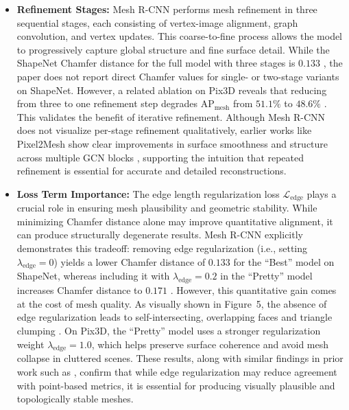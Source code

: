 \begin{itemize}
    \item \textbf{Refinement Stages:} Mesh R-CNN performs mesh refinement in three sequential stages, each consisting of vertex-image alignment, graph convolution, and vertex updates. This coarse-to-fine process allows the model to progressively capture global structure and fine surface detail. While the ShapeNet Chamfer distance for the full model with three stages is \( \mathbf{0.133} \) \cite[Table~2]{gkioxari2020_meshrcnn}, the paper does not report direct Chamfer values for single- or two-stage variants on ShapeNet. However, a related ablation on Pix3D reveals that reducing from three to one refinement step degrades AP$_\text{mesh}$ from \( \mathbf{51.1\%} \) to \( \mathbf{48.6\%} \) \cite[Table~4]{gkioxari2020_meshrcnn}. This validates the benefit of iterative refinement. Although Mesh R-CNN does not visualize per-stage refinement qualitatively, earlier works like Pixel2Mesh show clear improvements in surface smoothness and structure across multiple GCN blocks \cite[Figure~6]{wang2018_pixel2mesh}, supporting the intuition that repeated refinement is essential for accurate and detailed reconstructions.
    
    \item \textbf{Loss Term Importance:} The edge length regularization loss \( \mathcal{L}_{\text{edge}} \) plays a crucial role in ensuring mesh plausibility and geometric stability. While minimizing Chamfer distance alone may improve quantitative alignment, it can produce structurally degenerate results. Mesh R-CNN explicitly demonstrates this tradeoff: removing edge regularization (i.e., setting \( \lambda_{\text{edge}} = 0 \)) yields a lower Chamfer distance of \( \mathbf{0.133} \) for the ``Best'' model on ShapeNet, whereas including it with \( \lambda_{\text{edge}} = 0.2 \) in the ``Pretty'' model increases Chamfer distance to \( \mathbf{0.171} \) \cite[Table~2]{gkioxari2020_meshrcnn}. However, this quantitative gain comes at the cost of mesh quality. As visually shown in Figure~5, the absence of edge regularization leads to self-intersecting, overlapping faces and triangle clumping \cite[Figure~5]{gkioxari2020_meshrcnn}. On Pix3D, the ``Pretty'' model uses a stronger regularization weight \( \lambda_{\text{edge}} = 1.0 \), which helps preserve surface coherence and avoid mesh collapse in cluttered scenes. These results, along with similar findings in prior work such as \citet[Figure~5]{wang2018_pixel2mesh}, confirm that while edge regularization may reduce agreement with point-based metrics, it is essential for producing visually plausible and topologically stable meshes.
    
\end{itemize}


